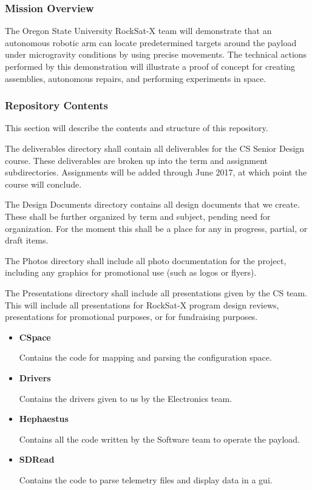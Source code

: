 \subsubsection{Mission Overview}
The Oregon State University RockSat-X team will demonstrate that an autonomous robotic arm can locate predetermined targets around the payload under microgravity conditions by using precise movements. The technical actions performed by this demonstration will illustrate a proof of concept for creating assemblies, autonomous repairs, and performing experiments in space.

\subsubsection{Repository Contents}
This section will describe the contents and structure of this repository.

The deliverables directory shall contain all deliverables for the CS Senior Design course. These deliverables are broken up into the term and assignment subdirectories. Assignments will be added through June 2017, at which point the course will conclude.

The Design Documents directory contains all design documents that we create. These shall be further organized by term and subject, pending need for organization. For the moment this shall be a place for any in progress, partial, or draft items.

The Photos directory shall include all photo documentation for the project, including any graphics for promotional use (such as logos or flyers).

The Presentations directory shall include all presentations given by the CS team. This will include all presentations for RockSat-X program design reviews, presentations for promotional purposes, or for fundraising purposes.

\begin{itemize}
	\item \textbf{CSpace}

	Contains the code for mapping and parsing the configuration space.

	\item \textbf{Drivers}

	Contains the drivers given to us by the Electronics team.

	\item \textbf{Hephaestus}

	Contains all the code written by the Software team to operate the \gls{payload}.

	\item \textbf{SDRead}

	Contains the code to parse telemetry files and display data in a \gls{gui}.
\end{itemize}

